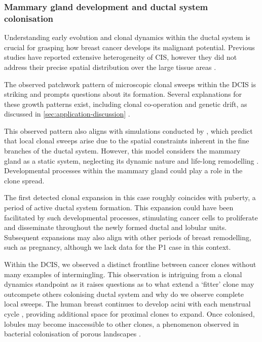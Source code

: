 
\subsubsection*{Mammary gland development and ductal system colonisation}

Understanding early evolution and clonal dynamics within the ductal system is crucial for grasping how breast cancer develops its malignant potential. Previous studies have reported extensive heterogeneity of \acl{CIS}, however they did not address their precise spatial distribution over the large tissue areas \parencite{Casasent2018-gx,Nishimura2023-mk,Yates2015-xk}. 

The observed patchwork pattern of microscopic clonal sweeps within the \ac{DCIS} is striking and prompts questions about its formation. Several explanations for these growth patterns exist, including clonal co-operation and genetic drift, as discussed in \cref{sec:application-discussion} \parencite{Janiszewska2019-zq,Turajlic2019-sr}.

This observed pattern also aligns with simulations conducted by \textcite{West2021-ar}, which predict that local clonal sweeps arise due to the spatial constraints inherent in the fine branches of the ductal system. However, this model considers the mammary gland as a static system, neglecting its dynamic nature and life-long remodelling . Developmental processes within the mammary gland could play a role in the clone spread.

The first detected clonal expansion in this case roughly coincides with puberty, a period of active ductal system formation. This expansion could have been facilitated by such developmental processes, stimulating cancer cells to proliferate and disseminate throughout the newly formed ductal and lobular units. Subsequent expansions may also align with other periods of breast remodelling, such as pregnancy, although we lack data for the P1 case in this context.

Within the \ac{DCIS}, we observed a distinct frontline between cancer clones without many examples of intermingling. This observation is intriguing from a clonal dynamics standpoint as it raises questions as to what extend a `fitter' clone may outcompete others colonising ductal system and why do we observe complete local sweeps. The human breast continues to develop acini with each menstrual cycle \parencite{Javed2013-ew}, providing additional space for proximal clones to expand. Once colonised, lobules may become inaccessible to other clones, a phenomenon observed in bacterial colonisation of porous landscapes \parencite{Conwill2022-sp}.

